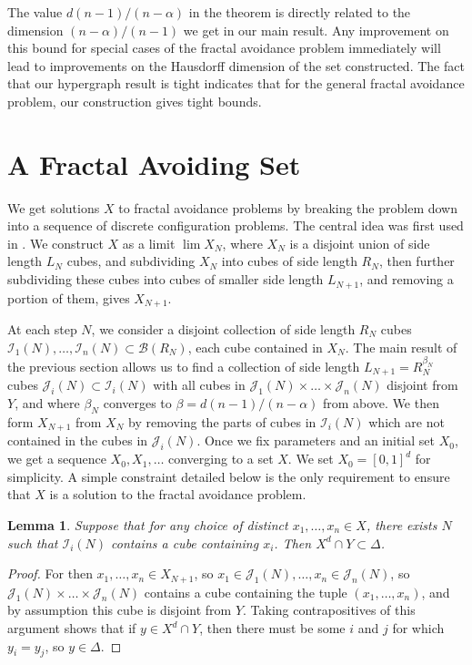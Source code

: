 \documentclass{article}
\theoremstyle{plain}
\newtheorem{lemma}{Lemma}
\theoremstyle{plain}
\begin{document}
\begin{multicols}{2}
The value $d(n-1)/(n-\alpha)$ in the theorem is directly related to the dimension $(n-\alpha)/(n-1)$ we get in our main result. Any improvement on this bound for special cases of the fractal avoidance problem immediately will lead to improvements on the Hausdorff dimension of the set constructed. The fact that our hypergraph result is tight indicates that for the general fractal avoidance problem, our construction gives tight bounds.


\section{A Fractal Avoiding Set}

We get solutions $X$ to fractal avoidance problems by breaking the problem down into a sequence of discrete configuration problems. The central idea was first used in \cite{MalabikaRob}. We construct $X$ as a limit $\lim X_N$, where $X_N$ is a disjoint union of side length $L_N$ cubes, and subdividing $X_N$ into cubes of side length $R_N$, then further subdividing these cubes into cubes of smaller side length $L_{N+1}$, and removing a portion of them, gives $X_{N+1}$.

At each step $N$, we consider a disjoint collection of side length $R_N$ cubes $\mathcal{I}_1(N), \dots, \mathcal{I}_n(N) \subset \mathcal{B}(R_N)$, each cube contained in $X_N$. The main result of the previous section allows us to find a collection of side length $L_{N+1} = R_N^{\beta_N}$ cubes $\mathcal{J}_i(N) \subset \mathcal{I}_i(N)$ with all cubes in $\mathcal{J}_1(N) \times \dots \times \mathcal{J}_n(N)$ disjoint from $Y$, and where $\beta_N$ converges to $\beta = d(n-1)/(n-\alpha)$ from above. We then form $X_{N+1}$ from $X_N$ by removing the parts of cubes in $\mathcal{I}_i(N)$ which are not contained in the cubes in $\mathcal{J}_i(N)$. Once we fix parameters and an initial set $X_0$, we get a sequence $X_0, X_1, \dots$ converging to a set $X$. We set $X_0 = [0,1]^d$ for simplicity. A simple constraint detailed below is the only requirement to ensure that $X$ is a solution to the fractal avoidance problem.

\begin{lemma}
	Suppose that for any choice of distinct $x_1, \dots, x_n \in X$, there exists $N$ such that $\mathcal{I}_i(N)$ contains a cube containing $x_i$. Then $X^d \cap Y \subset \Delta$.
\end{lemma}
\begin{proof}
	For then $x_1, \dots, x_n \in X_{N+1}$, so $x_1 \in \mathcal{J}_1(N), \dots, x_n \in \mathcal{J}_n(N)$, so $\mathcal{J}_1(N) \times \dots \times \mathcal{J}_n(N)$ contains a cube containing the tuple $(x_1, \dots, x_n)$, and by assumption this cube is disjoint from $Y$. Taking contrapositives of this argument shows that if $y \in X^d \cap Y$, then there must be some $i$ and $j$ for which $y_i = y_j$, so $y \in \Delta$.
\end{proof}


\end{multicols}
\end{document}
